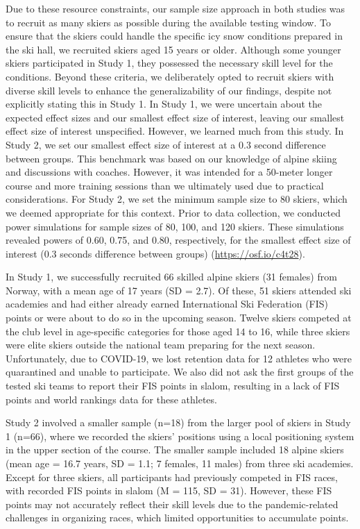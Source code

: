 Due to these resource constraints, our sample size approach in both studies was to recruit as many skiers as possible during the available testing window. To ensure that the skiers could handle the specific icy snow conditions prepared in the ski hall, we recruited skiers aged 15 years or older. Although some younger skiers participated in Study 1, they possessed the necessary skill level for the conditions. Beyond these criteria, we deliberately opted to recruit skiers with diverse skill levels to enhance the generalizability of our findings, despite not explicitly stating this in Study 1. In Study 1, we were uncertain about the expected effect sizes and our smallest effect size of interest, leaving our smallest effect size of interest unspecified. However, we learned much from this study. In Study 2, we set our smallest effect size of interest at a 0.3 second difference between groups. This benchmark was based on our knowledge of alpine skiing and discussions with coaches. However, it was intended for a 50-meter longer course and more training sessions than we ultimately used due to practical considerations. For Study 2, we set the minimum sample size to 80 skiers, which we deemed appropriate for this context. Prior to data collection, we conducted power simulations for sample sizes of 80, 100, and 120 skiers. These simulations revealed powers of 0.60, 0.75, and 0.80, respectively, for the smallest effect size of interest (0.3 seconds difference between groups) (\url{https://osf.io/c4t28}). 

In Study 1, we successfully recruited 66 skilled alpine skiers (31 females) from Norway, with a mean age of 17 years (SD = 2.7). Of these, 51 skiers attended ski academies and had either already earned International Ski Federation (FIS) points or were about to do so in the upcoming season. Twelve skiers competed at the club level in age-specific categories for those aged 14 to 16, while three skiers were elite skiers outside the national team preparing for the next season. Unfortunately, due to COVID-19, we lost retention data for 12 athletes who were quarantined and unable to participate. We also did not ask the first groups of the tested ski teams to report their FIS points in slalom, resulting in a lack of FIS points and world rankings data for these athletes.

Study 2 involved a smaller sample (n=18) from the larger pool of skiers in Study 1 (n=66), where we recorded the skiers' positions using a local positioning system in the upper section of the course. The smaller sample included 18 alpine skiers (mean age = 16.7 years, SD = 1.1; 7 females, 11 males) from three ski academies. Except for three skiers, all participants had previously competed in FIS races, with recorded FIS points in slalom (M = 115, SD = 31). However, these FIS points may not accurately reflect their skill levels due to the pandemic-related challenges in organizing races, which limited opportunities to accumulate points.

